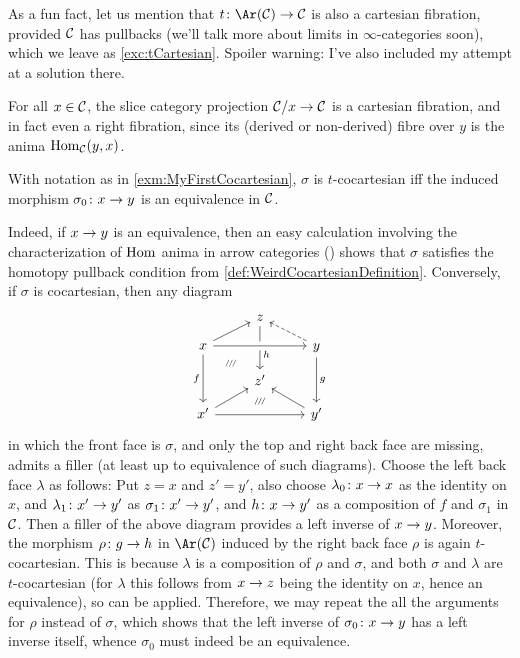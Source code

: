\begin{exm}
\begin{alphanumerate}
		As a fun fact, let us mention that $t\colon\Ar(\Cc)\morphism\Cc$ is also a cartesian fibration, provided $\mathcal{C}$ has pullbacks (we'll talk more about limits in $\infty$-categories soon), which we leave as \cref{exc:tCartesian}. Spoiler warning: I've also included my attempt at a solution there.
		\item For all $x\in \mathcal{C}$, the slice category projection $\Cc/x\morphism \Cc$ is a cartesian fibration, and in fact even a right fibration, since its (derived or non-derived) fibre over $y$ is the anima $\operatorname{Hom}_{\mathcal{C}}(y,x)$.
	\end{alphanumerate}
\end{exm}
\begin{lem*}\label{lem*:Ar(C)toC}
	With notation as in \cref{exm:MyFirstCocartesian}, $\sigma$ is $t$-cocartesian iff the induced morphism $\sigma_0\colon x\morphism y$ is an equivalence in $\mathcal{C}$.
\end{lem*}
\begin{proof*}
	Indeed, if $x\morphism y$ is an equivalence, then an easy calculation involving the characterization of $\operatorname{Hom}$ anima in arrow categories (\cite[Proposition~VIII.5]{HigherCatsII}) shows that $\sigma$ satisfies the homotopy pullback condition from \cref{def:WeirdCocartesianDefinition}. Conversely, if $\sigma$ is cocartesian, then any diagram
	\begin{equation*}
		\begin{tikzcd}[row sep=small]
			& z\ar[dd,"h",pos=0.65] & \\
			x\ar[dd,"f"']\urar\ar[rr,crossing over]\drar[phantom,"\scriptscriptstyle /\!/\!/"] & & y\ar[dd,"g"]\ular[dashed]\\
			& z'\dar[phantom,"\scriptscriptstyle /\!/\!/",pos=0.65] & \\
			x'\urar\ar[rr] & \phantom{x} & y'\ular
		\end{tikzcd}
	\end{equation*}
	in which the front face is $\sigma$, and only the top and right back face are missing, admits a filler (at least up to equivalence of such diagrams). Choose the left back face $\lambda$ as follows: Put $z=x$ and $z'=y'$, also choose $\lambda_0\colon x\morphism x$ as the identity on $x$, and $\lambda_1\colon x'\morphism y'$ as $\sigma_1\colon x'\morphism y'$, and $h\colon x\morphism y'$ as a composition of $f$ and $\sigma_1$ in $\mathcal{C}$. Then a filler of the above diagram provides a left inverse of $x\morphism y$. Moreover, the morphism $\rho\colon g\morphism h$ in $\Ar(\Cc)$ induced by the right back face $\rho$ is again $t$-cocartesian. This is because $\lambda$ is a composition of $\rho$ and $\sigma$, and both $\sigma$ and $\lambda$ are $t$-cocartesian (for $\lambda$ this follows from $x\morphism z$ being the identity on $x$, hence an equivalence), so \cite[Proposition~IX.5]{HigherCatsII} can be applied. Therefore, we may repeat the all the arguments for $\rho$ instead of $\sigma$, which shows that the left inverse of $\sigma_0\colon x\morphism y$ has a left inverse itself, whence $\sigma_0$ must indeed be an equivalence.
\end{proof*}
